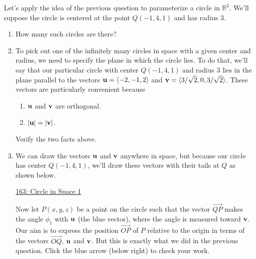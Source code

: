 \documentclass{ximera}
\begin{document}
\begin{question}  \label{Qdfrr54r55thlnmvvc}
Let's apply the idea of the previous question to parameterize a circle in $\mathbb{R}^3$. We'll suppose the circle is centered at the point $Q(-1,4,1)$ and has radius $3$. 

\begin{enumerate}

\item{How many such circles are there?
\begin{multipleChoice}
\end{multipleChoice}
}

\item{To pick out one of the infinitely many circles in space with a given center and radius, we need to specify the plane in which the circle lies. To do that, we'll say that our particular circle with center $Q(-1,4,1)$ and radius $3$ lies in the plane parallel to the vectors ${\bf u} = \langle -2, -1, 2 \rangle$ and ${\bf v}= \langle 3/\sqrt{2},0,3/\sqrt{2} \rangle$. These vectors are particularly convenient because
\begin{enumerate}
\item {${\bf u}$ and ${\bf v}$ are orthogonal.}

\item{$|{\bf u}| = |{\bf v}|$.}
\end{enumerate}

\begin{freeResponse}
Verify the two facts above.
\end{freeResponse}
}

\item{We can draw the vectors ${\bf u}$ and ${\bf v}$ anywhere in space, but because our circle has center $Q(-1,4,1)$, we'll draw these vectors with their tails at $Q$ as shown below.

\begin{onlineOnly}
    \begin{center}
\end{center}
\end{onlineOnly}

\href{https://www.desmos.com/3d/ftosqazxfm}{163: Circle in Space 1}

Now let $P(x,y,z)$ be a point on the circle such that the vector $\overrightarrow{QP}$ makes the angle $\phi_1$ with ${\bf u}$ (the blue vector), where the angle is measured toward ${\bf v}$. Our aim is to express the position $\overrightarrow{OP}$ of $P$ relative to the origin in terms of the vectors $\overrightarrow{OQ}$, ${\bf u}$ and ${\bf v}$. But this is exactly what we did in the previous question. Click the blue arrow (below right) to check your work.

}
\end{enumerate}
\end{question}
\end{document}
